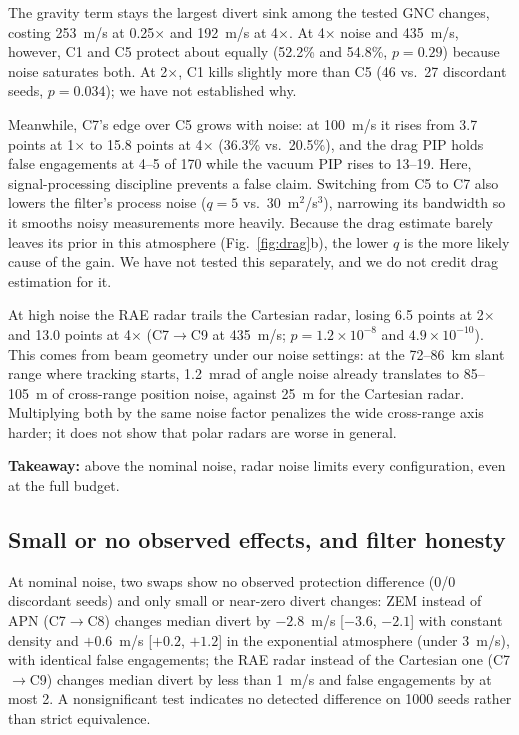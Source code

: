 \documentclass[conference,letterpaper]{IEEEtran}
\begin{document}
The gravity term stays the largest divert sink among the tested GNC changes, costing 253~m/s at 0.25$\times$ and 192~m/s at 4$\times$.
At 4$\times$ noise and 435~m/s, however, C1 and C5 protect about equally (52.2\% and 54.8\%, $p = 0.29$) because noise saturates both.
At 2$\times$, C1 kills slightly more than C5 (46 vs.\ 27 discordant seeds, $p = 0.034$); we have not established why.

Meanwhile, C7's edge over C5 grows with noise: at 100~m/s it rises from 3.7 points at 1$\times$ to 15.8 points at 4$\times$ (36.3\% vs.\ 20.5\%), and the drag PIP holds false engagements at 4--5 of 170 while the vacuum PIP rises to 13--19.
Here, signal-processing discipline prevents a false claim.
Switching from C5 to C7 also lowers the filter's process noise ($q = 5$ vs.\ 30~m$^2$/s$^3$), narrowing its bandwidth so it smooths noisy measurements more heavily.
Because the drag estimate barely leaves its prior in this atmosphere (Fig.~\ref{fig:drag}b), the lower $q$ is the more likely cause of the gain.
We have not tested this separately, and we do not credit drag estimation for it.

At high noise the RAE radar trails the Cartesian radar, losing 6.5 points at 2$\times$ and 13.0 points at 4$\times$ (C7$\to$C9 at 435~m/s; $p = 1.2\times10^{-8}$ and $4.9\times10^{-10}$).
This comes from beam geometry under our noise settings: at the 72--86~km slant range where tracking starts, 1.2~mrad of angle noise already translates to 85--105~m of cross-range position noise, against 25~m for the Cartesian radar.
Multiplying both by the same noise factor penalizes the wide cross-range axis harder; it does not show that polar radars are worse in general.

\textbf{Takeaway:} above the nominal noise, radar noise limits every configuration, even at the full budget.

\subsection{Small or no observed effects, and filter honesty}

At nominal noise, two swaps show no observed protection difference (0/0 discordant seeds) and only small or near-zero divert changes: ZEM instead of APN (C7$\to$C8) changes median divert by $-2.8$~m/s [$-3.6$, $-2.1$] with constant density and $+0.6$~m/s [$+0.2$, $+1.2$] in the exponential atmosphere (under 3~m/s), with identical false engagements; the RAE radar instead of the Cartesian one (C7$\to$C9) changes median divert by less than 1~m/s and false engagements by at most 2.
A nonsignificant test indicates no detected difference on 1000 seeds rather than strict equivalence.
\end{document}
